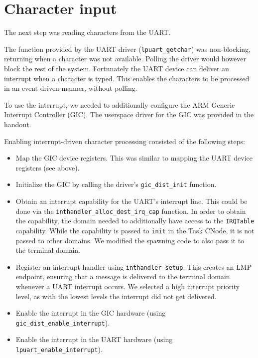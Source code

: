 \section{Character input}

The next step was reading characters from the UART.

The function provided by the UART driver (\verb|lpuart_getchar|) was non-blocking, returning when a character was not available.
Polling the driver would however block the rest of the system.
Fortunately the UART device can deliver an interrupt when a character is typed.
This enables the characters to be processed in an event-driven manner, without polling.

To use the interrupt, we needed to additionally configure the ARM Generic Interrupt Controller (GIC).
The userspace driver for the GIC was provided in the handout.

Enabling interrupt-driven character processing consisted of the following steps:

\begin{itemize}

    \item
        Map the GIC device registers. This was similar to mapping the UART device registers (see above).

    \item
        Initialize the GIC by calling the driver's \verb|gic_dist_init| function.

    \item
        Obtain an interrupt capability for the UART's interrupt line.
        This could be done via the \verb|inthandler_alloc_dest_irq_cap| function.
        In order to obtain the capability, the domain needed to additionally have access to the \verb|IRQTable| capability.
        While the capability is passed to \verb|init| in the Task CNode, it is not passed to other domains.
        We modified the spawning code to also pass it to the terminal domain.

    \item
        Register an interrupt handler using \verb|inthandler_setup|.
        This creates an LMP endpoint, ensuring that a message is delivered to the terminal domain whenever a UART interrupt occurs.
        We selected a high interrupt priority level, as with the lowest levels the interrupt did not get delivered.

    \item
        Enable the interrupt in the GIC hardware (using \verb|gic_dist_enable_interrupt|).

    \item
        Enable the interrupt in the UART hardware (using \verb|lpuart_enable_interrupt|).

\end{itemize}


